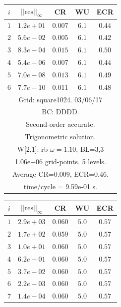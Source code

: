 \begin{table}[hbt]
\begin{center}
{\tablefontsize
\begin{tabular}{|c|c|c|c|c|} \hline 
 $i$   & $\vert\vert\mbox{res}\vert\vert_\infty$  &  CR     &  WU    & ECR  \\   \hline 
 $ 1$  & $ 1.2e+01$ & $0.007$ & $ 6.1$ & $0.44$ \\ 
 $ 2$  & $ 5.6e-02$ & $0.005$ & $ 6.1$ & $0.42$ \\ 
 $ 3$  & $ 8.3e-04$ & $0.015$ & $ 6.1$ & $0.50$ \\ 
 $ 4$  & $ 5.4e-06$ & $0.007$ & $ 6.1$ & $0.44$ \\ 
 $ 5$  & $ 7.0e-08$ & $0.013$ & $ 6.1$ & $0.49$ \\ 
 $ 6$  & $ 7.7e-10$ & $0.011$ & $ 6.1$ & $0.48$ \\ 
\hline 
\multicolumn{5}{|c|}{Grid: square1024. 03/06/17}  \\
\multicolumn{5}{|c|}{BC: DDDD.}  \\
\multicolumn{5}{|c|}{Second-order accurate.}  \\
\multicolumn{5}{|c|}{Trigonometric solution.}  \\
\multicolumn{5}{|c|}{W[2,1]: rb $\omega=1.10$, BL=3,3}\\
\multicolumn{5}{|c|}{1.06e+06 grid-points. 5 levels.}  \\
\multicolumn{5}{|c|}{Average CR=$0.009$, ECR=$0.46$.}  \\
\multicolumn{5}{|c|}{time/cycle = 9.59e-01 s.}  \\
\hline 
\end{tabular}
\begin{tabular}{|c|c|c|c|c|} \hline 
 $i$   & $\vert\vert\mbox{res}\vert\vert_\infty$  &  CR     &  WU    & ECR  \\   \hline 
 $ 1$  & $ 2.9e+03$ & $0.060$ & $ 5.0$ & $0.57$ \\ 
 $ 2$  & $ 1.7e+02$ & $0.059$ & $ 5.0$ & $0.57$ \\ 
 $ 3$  & $ 1.0e+01$ & $0.060$ & $ 5.0$ & $0.57$ \\ 
 $ 4$  & $ 6.2e-01$ & $0.060$ & $ 5.0$ & $0.57$ \\ 
 $ 5$  & $ 3.7e-02$ & $0.060$ & $ 5.0$ & $0.57$ \\ 
 $ 6$  & $ 2.2e-03$ & $0.060$ & $ 5.0$ & $0.57$ \\ 
 $ 7$  & $ 1.4e-04$ & $0.060$ & $ 5.0$ & $0.57$ \\ 

\end{tabular}}
\end{center}
\end{table}
